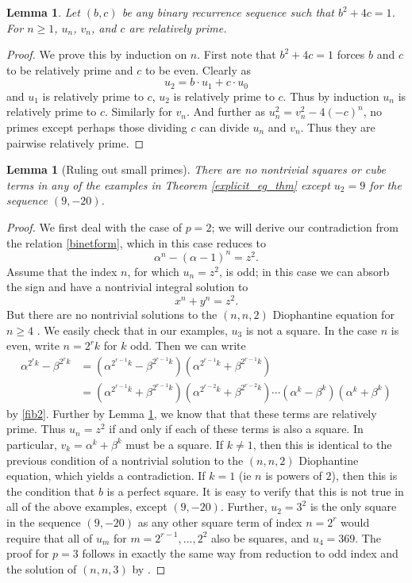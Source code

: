 \documentclass[12pt]{amsart}
\newtheorem{lem}[thm]{Lemma}
\theoremstyle{definition}
\begin{document}
\begin{lem}\label{relprime}
Let $(b,c)$ be any binary recurrence sequence such that $b^2+4c=1$.  For $n \geq 1$,  $u_n$, $v_n$, and $c$ are relatively prime.
\end{lem}

\begin{proof}
We prove this by induction on $n$.  First note that $b^2 +4c = 1$ forces $b$ and $c$ to be relatively prime and $c$ to be even.  Clearly as
\[ u_2 = b \cdot u_1 + c \cdot u_0 \]
and $u_1$ is relatively prime to $c$, $u_2$ is relatively prime to $c$.  Thus by induction $u_n$ is relatively prime to $c$.  Similarly for $v_n$.  And further as $u_n^2  = v_n^2 - 4(-c)^n$, no primes except perhaps those dividing $c$ can divide $u_n$ and $v_n$.  Thus they are pairwise relatively prime.
\end{proof}

\begin{lem}[Ruling out small primes]\label{smallp}
There are no nontrivial squares or cube terms in any of the examples in Theorem \ref{explicit_eg_thm} except $u_2 = 9$ for the sequence $(9,-20)$.
\end{lem}

\begin{proof}

We first deal with the case of $p=2$; we will derive our contradiction from the relation \eqref{binetform}, which in this case reduces to
\[ \alpha^n - (\alpha-1)^n = z^2.\]
Assume that the index $n$, for which $u_n = z^2$, is odd; in this case we can absorb the sign and have a nontrivial integral solution to
\[ x^n +y^n = z^2. \]
But there are no nontrivial solutions to the $(n,n,2)$ Diophantine equation for $n \geq 4$  \cite{darmon97}.  We easily check that in our examples, $u_3$ is not a square.  In the case $n$ is even, write $n=2^rk$ for $k$ odd.  Then we can write
\begin{align*}
\alpha^{2^rk} - \beta^{2^rk} & = (\alpha^{2^{r-1}k} - \beta^{2^{r-1}k})(\alpha^{2^{r-1}k} + \beta^{2^{r-1}k}) \\
& = (\alpha^{2^{r-1}k} + \beta^{2^{r-1}k})(\alpha^{2^{r-2}k} + \beta^{2^{r-2}k}) \cdots (\alpha^{k} - \beta^{k}) (\alpha^{k} + \beta^{k})
\end{align*}
by \eqref{fib2}.  Further by Lemma \ref{relprime}, we know that that these terms are relatively prime.  Thus $u_n=z^2$ if and only if each of these terms is also a square.  In particular, $v_k = \alpha^k + \beta^k$ must be a square.  If $k \neq 1$, then this is identical to the previous condition of a nontrivial solution to the $(n,n,2)$ Diophantine equation, which yields a contradiction.  If $k = 1$ (ie $n$ is powers of $2$), then this is the condition that $b$ is a perfect square.  It is easy to verify that this is not true in all of the above examples, except $(9,-20)$.  Further, $u_2 = 3^2$ is the only square in the sequence $(9,-20)$ as any other square term of index $n = 2^r$ would require that all of $u_m$ for $m = 2^{r-1},...,2^2$ also be squares, and $u_4 = 369$.  The proof for $p=3$ follows in exactly the same way from reduction to odd index and the solution of $(n,n,3)$ by \cite{darmon97}.

\end{proof}
\end{document}

